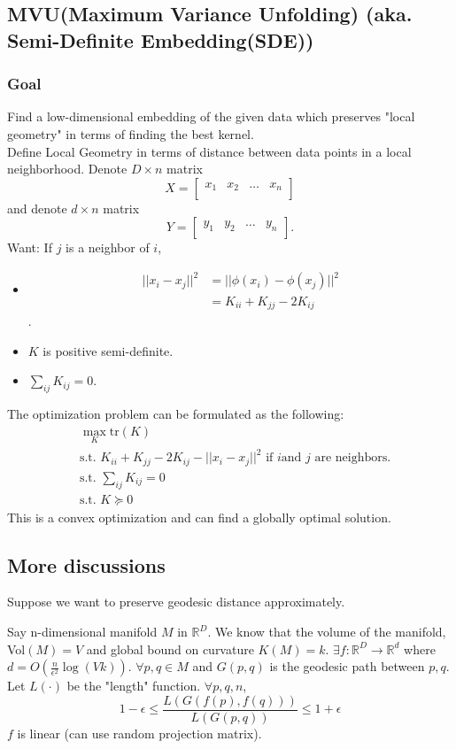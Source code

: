\subsection*{MVU(Maximum Variance Unfolding) (aka. Semi-Definite Embedding(SDE))}
\subsubsection*{Goal} Find a low-dimensional embedding of the given
data which preserves "local geometry" in terms of finding the best
kernel.\\
Define Local Geometry in terms of distance between data points in a
local neighborhood. Denote $D\times n$ matrix
\[
X=
\begin{bmatrix}
    x_1 & x_2 & \dots & x_n \\
\end{bmatrix}
\]
and denote $d\times n$ matrix
\[
Y=
\begin{bmatrix}
    y_1 & y_2 & \dots & y_n \\
\end{bmatrix}.
\]
Want: If $j$ is a neighbor of $i$,
\begin{itemize}
\item \begin{align*}
||x_i - x_j||^2
&=||\phi (x_i)-\phi (x_j)||^2\\
&=K_{ii}+K_{jj}-2K_{ij}
\end{align*}.
\item $K$ is positive semi-definite.
\item $\sum_{ij} K_{ij}=0$.
\end{itemize}

The optimization problem can be formulated as the following:
\begin{align*}
&\max_{K} \text{tr}(K)\\
&\text{s.t. } K_{ii}+K_{jj}-2K_{ij}-||x_i-x_j||^2 \text{ if }i \text{
    and } j \text{ are neighbors}.\\ 
&\text{s.t. } \sum_{ij}K_{ij}=0\\
&\text{s.t. } K \succeq 0
\end{align*}
This is a convex optimization and can find a globally optimal solution.

\subsection*{More discussions}
Suppose we want to preserve geodesic distance approximately.
\begin{theorem}[JL-manifold]
Say n-dimensional manifold $M$ in $\mathbb{R}^D$. We know that the
volume of the manifold, Vol$(M)=V$ and global bound on curvature
$K(M)=k$. $\exists f: \mathbb{R}^D \rightarrow \mathbb{R}^d$ where
$d=O(\frac{n}{\epsilon^2}\log (Vk) )$. $\forall p,q \in M$ and
$G(p,q)$ is the geodesic path between $p,q$. Let $L(\cdot)$ be the
"length" function. $\forall p,q,n$, 
\[
1-\epsilon \leq \frac{L(G(f(p),f(q)))}{L(G(p,q))} \leq 1+\epsilon
\]
$f$ is linear (can use random projection matrix).
\end{theorem}
